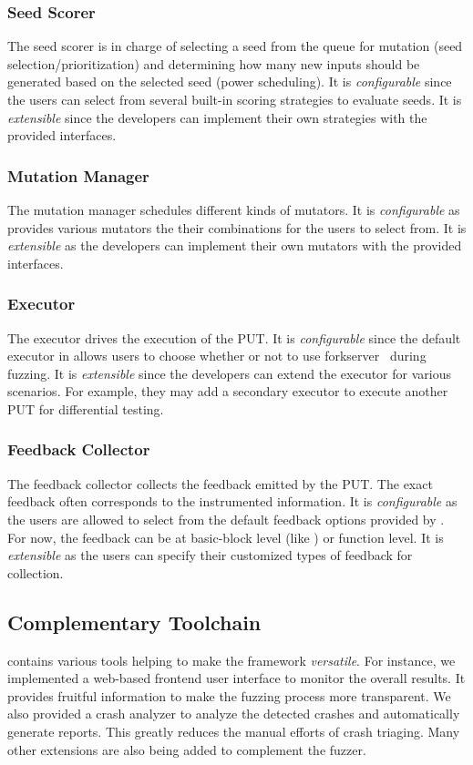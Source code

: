 \subsubsection{Seed Scorer}
The seed scorer is in charge of selecting a seed from the queue for mutation (seed selection/prioritization) and determining how many new inputs should be generated based on the selected seed (power scheduling).
It is \textit{configurable} since the users can select from several built-in scoring strategies to evaluate seeds.
It is \textit{extensible} since the developers can implement their own strategies with the provided interfaces.


\subsubsection{Mutation Manager}
The mutation manager schedules different kinds of mutators.
It is \textit{configurable} as {\FOT} provides various mutators the their combinations for the users to select from.
It is \textit{extensible} as the developers can implement their own mutators with the provided interfaces.

\subsubsection{Executor}
The executor drives the execution of the PUT.
It is \textit{configurable} since the default executor in {\FOT} allows users to choose whether or not to use forkserver~\cite{afl} during fuzzing.
It is \textit{extensible} since the developers can extend the executor for various scenarios.
For example, they may add a secondary executor to execute another PUT for differential testing.

\subsubsection{Feedback Collector}
The feedback collector collects the feedback emitted by the PUT.
The exact feedback often corresponds to the instrumented information.
It is \textit{configurable} as the users are allowed to select from the default feedback options provided by {\FOT}.
For now, the feedback can be at basic-block level (like {\AFL}) or function level.
It is \textit{extensible} as the users can specify their customized types of feedback for collection.

\subsection{Complementary Toolchain}
{\FOT} contains various tools helping to make the framework \textit{versatile}.
For instance, we implemented a web-based frontend user interface to monitor the overall results.
It provides fruitful information to make the fuzzing process more transparent.
We also provided a crash analyzer to analyze the detected crashes and automatically generate reports.
This greatly reduces the manual efforts of crash triaging.
Many other extensions are also being added to complement the fuzzer.


